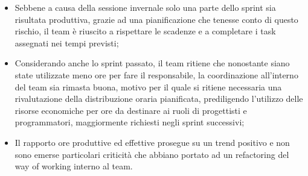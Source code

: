 \documentclass[10pt, a4paper]{article}
\begin{document}
\begin{itemize}
    \item Sebbene a causa della sessione invernale solo una parte dello sprint sia risultata produttiva, grazie
    ad una pianificazione che tenesse conto di questo rischio, il team è riuscito a rispettare le scadenze e a 
    completare i task assegnati nei tempi previsti;
    \item Considerando anche lo sprint passato, il team ritiene che nonostante siano state utilizzate meno ore per fare il responsabile,
    la coordinazione all'interno del team sia rimasta buona, motivo per il quale si ritiene necessaria una rivalutazione della distribuzione oraria pianificata, 
    prediligendo l'utilizzo delle risorse economiche per ore da destinare ai ruoli di progettisti e programmatori, maggiormente richiesti negli sprint successivi;
    \item Il rapporto ore produttive ed effettive prosegue su un trend positivo e non sono emerse particolari criticità
    che abbiano portato ad un refactoring del way of working interno al team.
\end{itemize}
\end{document}
